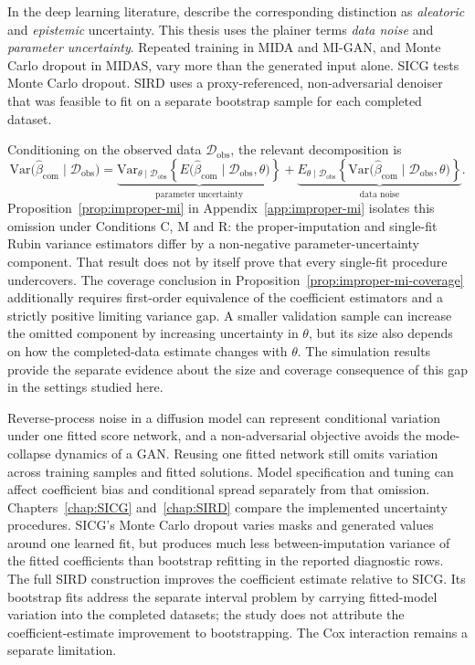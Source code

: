 In the deep learning literature, \citet{gawlikowski2023survey} describe the corresponding distinction as \emph{aleatoric} and \emph{epistemic} uncertainty. This thesis uses the plainer terms \emph{data noise} and \emph{parameter uncertainty}. Repeated training in MIDA and MI-GAN, and Monte Carlo dropout in MIDAS, vary more than the generated input alone. SICG tests Monte Carlo dropout. SIRD uses a proxy-referenced, non-adversarial denoiser that was feasible to fit on a separate bootstrap sample for each completed dataset.

Conditioning on the observed data $\mathcal{D}_{\mathrm{obs}}$, the relevant decomposition is
\begin{equation}
    \mathrm{Var}\bigl(\hat{\beta}_{\mathrm{com}}\mid\mathcal{D}_{\mathrm{obs}}\bigr)
    = \underbrace{\mathrm{Var}_{\theta\mid\mathcal{D}_{\mathrm{obs}}}
      \!\left\{E\bigl(\hat{\beta}_{\mathrm{com}}\mid
      \mathcal{D}_{\mathrm{obs}},\theta\bigr)\right\}}_{\text{parameter uncertainty}}
    + \underbrace{E_{\theta\mid\mathcal{D}_{\mathrm{obs}}}
      \!\left\{\mathrm{Var}\bigl(\hat{\beta}_{\mathrm{com}}\mid
      \mathcal{D}_{\mathrm{obs}},\theta\bigr)\right\}}_{\text{data noise}}.
    \label{eq:var_decomp}
\end{equation}
Proposition~\ref{prop:improper-mi} in Appendix~\ref{app:improper-mi} isolates this omission under Conditions C, M and R: the proper-imputation and single-fit Rubin variance estimators differ by a non-negative parameter-uncertainty component. That result does not by itself prove that every single-fit procedure undercovers. The coverage conclusion in Proposition~\ref{prop:improper-mi-coverage} additionally requires first-order equivalence of the coefficient estimators and a strictly positive limiting variance gap. A smaller validation sample can increase the omitted component by increasing uncertainty in $\theta$, but its size also depends on how the completed-data estimate changes with $\theta$. The simulation results provide the separate evidence about the size and coverage consequence of this gap in the settings studied here.

Reverse-process noise in a diffusion model can represent conditional variation under one fitted score network, and a non-adversarial objective avoids the mode-collapse dynamics of a GAN. Reusing one fitted network still omits variation across training samples and fitted solutions. Model specification and tuning can affect coefficient bias and conditional spread separately from that omission. Chapters~\ref{chap:SICG} and~\ref{chap:SIRD} compare the implemented uncertainty procedures. SICG's Monte Carlo dropout varies masks and generated values around one learned fit, but produces much less between-imputation variance of the fitted coefficients than bootstrap refitting in the reported diagnostic rows. The full SIRD construction improves the coefficient estimate relative to SICG. Its bootstrap fits address the separate interval problem by carrying fitted-model variation into the completed datasets; the study does not attribute the coefficient-estimate improvement to bootstrapping. The Cox interaction remains a separate limitation.

